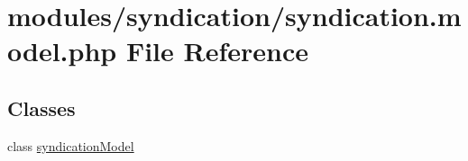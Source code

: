 \hypertarget{syndication_8model_8php}{\section{modules/syndication/syndication.model.\-php File Reference}
\label{syndication_8model_8php}
}
\subsection*{Classes}
\begin{DoxyCompactItemize}
\item 
class \hyperlink{classsyndicationModel}{syndication\-Model}
\end{DoxyCompactItemize}
